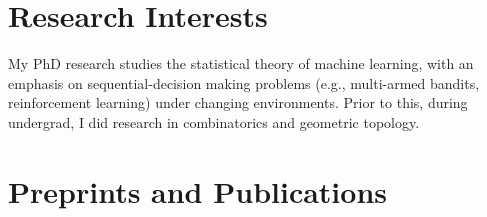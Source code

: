\documentclass[10pt,a4paper]{moderncv}        %
\begin{document}

\section{Research Interests}

My PhD research studies the statistical theory of machine learning, with an emphasis on sequential-decision making problems (e.g., multi-armed bandits, reinforcement learning) under changing environments.
Prior to this, during undergrad, I did research in combinatorics and geometric topology.

\section{Preprints and Publications}
\end{document}

